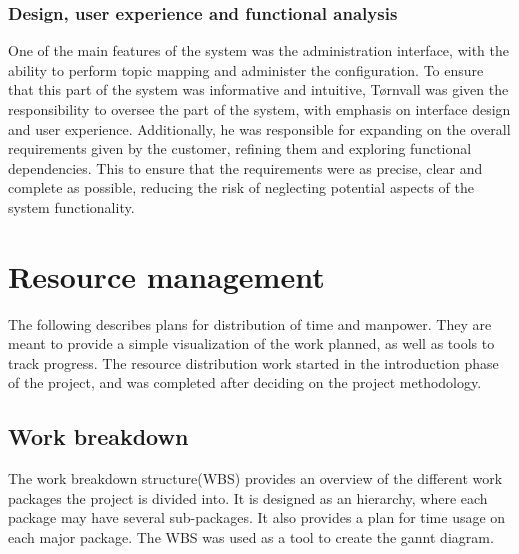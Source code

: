 \subsubsection{Design, user experience and functional analysis}

One of the main features of the system was the administration interface, with the ability to perform topic mapping and administer the configuration. To ensure that this part of the system was informative and intuitive, Tørnvall was given the responsibility to oversee the part of the system, with emphasis on interface design and user experience. Additionally, he was responsible for expanding on the overall requirements given by the customer, refining them and exploring functional dependencies. This to ensure that the requirements were as precise, clear and complete as possible, reducing the risk of neglecting potential aspects of the system functionality.

\clearpage

\section{Resource management}

The following describes plans for distribution of time and manpower. They are meant to provide a simple visualization of the work planned, as well as tools to track progress. The resource distribution work started in the introduction phase of the project, and was completed after deciding on the project methodology.

\subsection{Work breakdown}

The work breakdown structure(WBS) provides an overview of the different work packages the project is divided into. It is designed as an hierarchy, where each package may have several sub-packages. It also provides a plan for time usage on each major package. The WBS was used as a tool to create the gannt diagram.

